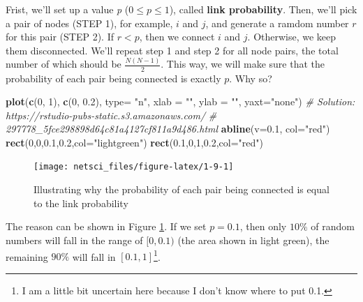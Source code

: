 \documentclass[
]{krantz}
\makeatletter
\newenvironment{Shaded}{\begin{snugshade}}{\end{snugshade}}
\newcommand{\CommentTok}[1]{\textcolor[rgb]{0.37,0.37,0.37}{\textit{#1}}}
\newcommand{\DataTypeTok}[1]{\textcolor[rgb]{0.27,0.27,0.27}{#1}}
\newcommand{\DecValTok}[1]{\textcolor[rgb]{0.06,0.06,0.06}{#1}}
\newcommand{\FloatTok}[1]{\textcolor[rgb]{0.06,0.06,0.06}{#1}}
\newcommand{\KeywordTok}[1]{\textcolor[rgb]{0.27,0.27,0.27}{\textbf{#1}}}
\newcommand{\NormalTok}[1]{#1}
\newcommand{\StringTok}[1]{\textcolor[rgb]{0.5,0.5,0.5}{#1}}
\newenvironment{kframe}{%
\medskip{}
\setlength{\fboxsep}{.8em}
 \def\at@end@of@kframe{}%
 \ifinner\ifhmode%
  \def\at@end@of@kframe{\end{minipage}}%
  \begin{minipage}{\columnwidth}%
 \fi\fi%
 \def\FrameCommand##1{\hskip\@totalleftmargin \hskip-\fboxsep
 \colorbox{shadecolor}{##1}\hskip-\fboxsep
     \hskip-\linewidth \hskip-\@totalleftmargin \hskip\columnwidth}%
 \MakeFramed {\advance\hsize-\width
   \@totalleftmargin\z@ \linewidth\hsize
   \@setminipage}}%
 {\par\unskip\endMakeFramed%
 \at@end@of@kframe}
\renewenvironment{Shaded}{\begin{kframe}}{\end{kframe}}
\makeatother
\begin{document}
Frist, we'll set up a value \emph{p} (\(0 \leq p \leq 1\)), called \textbf{link probability}. Then, we'll pick a pair of nodes (STEP 1), for example, \(i\) and \(j\), and generate a ramdom number \(r\) for this pair (STEP 2). If \(r < p\), then we connect \(i\) and \(j\). Otherwise, we keep them disconnected. We'll repeat step 1 and step 2 for all node pairs, the total number of which should be \(\frac{N(N-1)}{2}\). This way, we will make sure that the probability of each pair being connected is exactly \(p\). Why so?

\begin{Shaded}
\begin{Highlighting}[]
\KeywordTok{plot}\NormalTok{(}\KeywordTok{c}\NormalTok{(}\DecValTok{0}\NormalTok{, }\DecValTok{1}\NormalTok{), }\KeywordTok{c}\NormalTok{(}\DecValTok{0}\NormalTok{, }\FloatTok{0.2}\NormalTok{), }
     \DataTypeTok{type=} \StringTok{"n"}\NormalTok{, }
     \DataTypeTok{xlab =} \StringTok{""}\NormalTok{, }
     \DataTypeTok{ylab =} \StringTok{""}\NormalTok{, }
     \DataTypeTok{yaxt=}\StringTok{"none"}\NormalTok{)}
\CommentTok{# Solution: https://rstudio-pubs-static.s3.amazonaws.com/}
\CommentTok{# 297778_5fce298898d64c81a4127cf811a9d486.html}
\KeywordTok{abline}\NormalTok{(}\DataTypeTok{v=}\FloatTok{0.1}\NormalTok{, }\DataTypeTok{col=}\StringTok{"red"}\NormalTok{)}
\KeywordTok{rect}\NormalTok{(}\DecValTok{0}\NormalTok{,}\DecValTok{0}\NormalTok{,}\FloatTok{0.1}\NormalTok{,}\FloatTok{0.2}\NormalTok{,}\DataTypeTok{col=}\StringTok{"lightgreen"}\NormalTok{)}
\KeywordTok{rect}\NormalTok{(}\FloatTok{0.1}\NormalTok{,}\DecValTok{0}\NormalTok{,}\DecValTok{1}\NormalTok{,}\FloatTok{0.2}\NormalTok{,}\DataTypeTok{col=}\StringTok{"red"}\NormalTok{)}
\end{Highlighting}
\end{Shaded}

\begin{figure}

{\centering \texttt{[image: netsci\_files/figure-latex/1-9-1]} 

}

\caption{Illustrating why the probability of each pair being connected is equal to the link probability}\label{fig:1-9}
\end{figure}

The reason can be shown in Figure \ref{fig:1-9}. If we set \(p = 0.1\), then only \(10\%\) of random numbers will fall in the range of \([0,0.1)\) (the area shown in light green), the remaining \(90\%\) will fall in \([0.1,1]\)\footnote{I am a little bit uncertain here because I don't know where to put 0.1.}.
\end{document}
